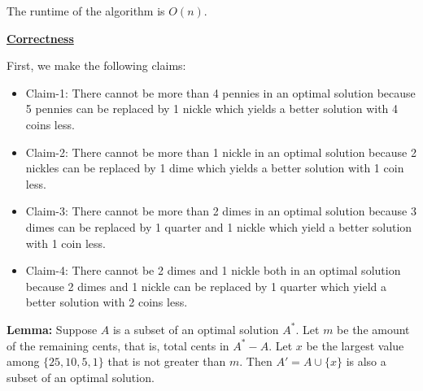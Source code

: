 \documentclass[11pt]{article}
\begin{document}
\begin{enumerate}
\begin{enumerate}
The runtime of the algorithm is $O(n)$.

\underline{\textbf{Correctness}}

First, we make the following claims:
\begin{itemize}
\item Claim-1: There cannot be more than 4 pennies in an optimal
  solution because 5 pennies can be replaced by 1 nickle which yields
  a better solution with 4 coins less.
\item Claim-2: There cannot be more than 1 nickle in an optimal
  solution because 2 nickles can be replaced by 1 dime which yields
  a better solution with 1 coin less.
\item Claim-3: There cannot be more than 2 dimes in an optimal
  solution because 3 dimes can be replaced by 1 quarter and 1 nickle
  which yield a better solution with 1 coin less.
\item Claim-4: There cannot be 2 dimes and 1 nickle both in an optimal
  solution because 2 dimes and 1 nickle can be replaced by 1 quarter
  which yield a better solution with 2 coins less.
\end{itemize}

\textbf{Lemma:} Suppose $A$ is a subset of an optimal solution $A^*$.
Let $m$ be the amount of the remaining cents, that is, total cents in $A^*-A$.
Let $x$ be the largest value among $\{25,10,5,1\}$ that is not greater
than $m$. Then $A' = A \cup \{x\}$ is also a subset of an optimal solution.


\end{enumerate}
\end{enumerate}
\end{document}
